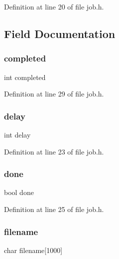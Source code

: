Definition at line 20 of file job.\+h.



\subsection{Field Documentation}
\mbox{\label{structjob_a4eff08519948266efdd345aabe6ecbbb}} 
\subsubsection{\texorpdfstring{completed}{completed}}
{\footnotesize\ttfamily int completed}



Definition at line 29 of file job.\+h.

\mbox{\label{structjob_a6f1be1f780ff54ec75b41451cd4d90bd}} 
\subsubsection{\texorpdfstring{delay}{delay}}
{\footnotesize\ttfamily int delay}



Definition at line 23 of file job.\+h.

\mbox{\label{structjob_a1d39aac66e12dae50a24cd7a9100ef33}} 
\subsubsection{\texorpdfstring{done}{done}}
{\footnotesize\ttfamily bool done}



Definition at line 25 of file job.\+h.

\mbox{\label{structjob_aa9a76d9571bf39c3d168d222f931ff86}} 
\subsubsection{\texorpdfstring{filename}{filename}}
{\footnotesize\ttfamily char filename\mbox{[}1000\mbox{]}}




